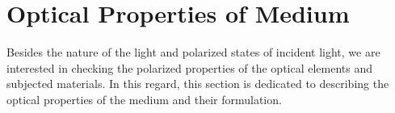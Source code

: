 \section{Optical Properties of Medium}\label{sec:chp4-sec4}

Besides the nature of the light and polarized states of incident light, we are interested in checking the polarized properties of the optical elements and subjected materials.
In this regard, this section is dedicated to describing the optical properties of the medium and their formulation.





